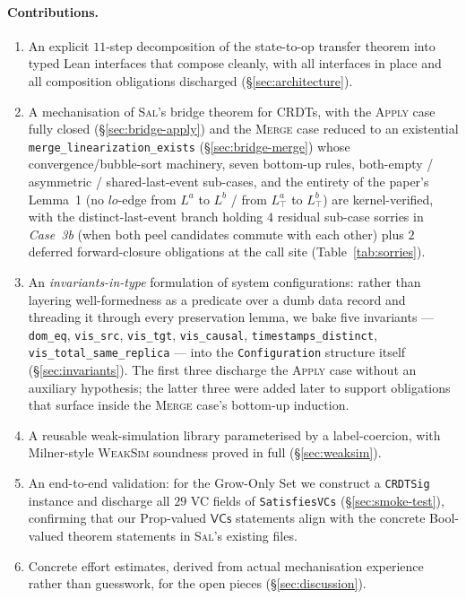 \documentclass[11pt,a4paper]{article}
\theoremstyle{definition}
\theoremstyle{remark}
\newcommand{\VCs}{\mathsf{VCs}}
\newcommand{\Sal}{\textsc{Sal}}
\begin{document}
\paragraph{Contributions.}
\begin{enumerate}[leftmargin=*]
  \item An explicit $11$-step decomposition of the state-to-op
    transfer theorem into typed Lean interfaces that compose
    cleanly, with all interfaces in place and all composition
    obligations discharged (\S\ref{sec:architecture}).
  \item A mechanisation of \Sal{}'s bridge theorem for CRDTs, with
    the \textsc{Apply} case fully closed (\S\ref{sec:bridge-apply})
    and the \textsc{Merge} case reduced to an existential
    \texttt{merge\_linearization\_exists}
    (\S\ref{sec:bridge-merge}) whose convergence/bubble-sort
    machinery, seven bottom-up rules, both-empty / asymmetric /
    shared-last-event sub-cases, and the entirety of the paper's
    Lemma~1 (no $\mathit{lo}$-edge from $L^a$ to $L^b$ / from
    $L_\top^a$ to $L_\top^b$) are kernel-verified, with the
    distinct-last-event branch holding $4$ residual sub-case
    sorries in \emph{Case~3b} (when both peel candidates commute
    with each other) plus $2$ deferred forward-closure obligations
    at the call site (Table~\ref{tab:sorries}).
  \item An \emph{invariants-in-type} formulation of system
    configurations: rather than layering well-formedness as a
    predicate over a dumb data record and threading it through every
    preservation lemma, we bake five invariants ---
    \texttt{dom\_eq}, \texttt{vis\_src}, \texttt{vis\_tgt},
    \texttt{vis\_causal}, \texttt{timestamps\_distinct},
    \texttt{vis\_total\_same\_replica} --- into the
    \texttt{Configuration} structure itself
    (\S\ref{sec:invariants}). The first three discharge the
    \textsc{Apply} case without an auxiliary hypothesis; the latter
    three were added later to support obligations that surface
    inside the \textsc{Merge} case's bottom-up induction.
  \item A reusable weak-simulation library parameterised by a
    label-coercion, with Milner-style \textsc{WeakSim} soundness
    proved in full (\S\ref{sec:weaksim}).
  \item An end-to-end validation: for the Grow-Only Set we construct
    a \texttt{CRDTSig} instance and discharge all $29$ VC fields of
    \texttt{SatisfiesVCs} (\S\ref{sec:smoke-test}), confirming that
    our Prop-valued $\VCs$ statements align with the concrete
    Bool-valued theorem statements in \Sal{}'s existing files.
  \item Concrete effort estimates, derived from actual mechanisation
    experience rather than guesswork, for the open pieces
    (\S\ref{sec:discussion}).
\end{enumerate}
\end{document}
